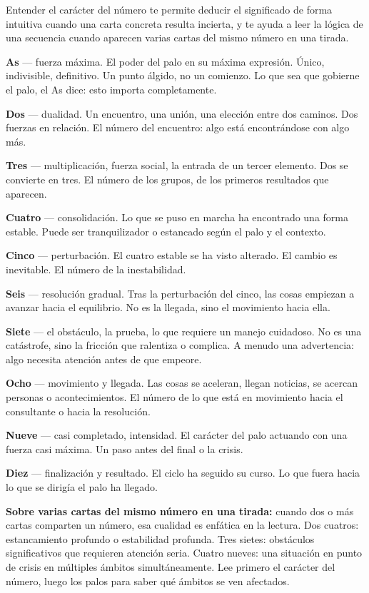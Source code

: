 Entender el carácter del número te permite deducir el significado de forma intuitiva cuando una carta concreta resulta incierta, y te ayuda a leer la lógica de una secuencia cuando aparecen varias cartas del mismo número en una tirada.

\textbf{As} --- fuerza máxima. El poder del palo en su máxima expresión. Único, indivisible, definitivo. Un punto álgido, no un comienzo. Lo que sea que gobierne el palo, el As dice: esto importa completamente.

\textbf{Dos} --- dualidad. Un encuentro, una unión, una elección entre dos caminos. Dos fuerzas en relación. El número del encuentro: algo está encontrándose con algo más.

\textbf{Tres} --- multiplicación, fuerza social, la entrada de un tercer elemento. Dos se convierte en tres. El número de los grupos, de los primeros resultados que aparecen.

\textbf{Cuatro} --- consolidación. Lo que se puso en marcha ha encontrado una forma estable. Puede ser tranquilizador o estancado según el palo y el contexto.

\textbf{Cinco} --- perturbación. El cuatro estable se ha visto alterado. El cambio es inevitable. El número de la inestabilidad.

\textbf{Seis} --- resolución gradual. Tras la perturbación del cinco, las cosas empiezan a avanzar hacia el equilibrio. No es la llegada, sino el movimiento hacia ella.

\textbf{Siete} --- el obstáculo, la prueba, lo que requiere un manejo cuidadoso. No es una catástrofe, sino la fricción que ralentiza o complica. A menudo una advertencia: algo necesita atención antes de que empeore.

\textbf{Ocho} --- movimiento y llegada. Las cosas se aceleran, llegan noticias, se acercan personas o acontecimientos. El número de lo que está en movimiento hacia el consultante o hacia la resolución.

\textbf{Nueve} --- casi completado, intensidad. El carácter del palo actuando con una fuerza casi máxima. Un paso antes del final o la crisis.

\textbf{Diez} --- finalización y resultado. El ciclo ha seguido su curso. Lo que fuera hacia lo que se dirigía el palo ha llegado.

\textbf{Sobre varias cartas del mismo número en una tirada:} cuando dos o más cartas comparten un número, esa cualidad es enfática en la lectura. Dos cuatros: estancamiento profundo o estabilidad profunda. Tres sietes: obstáculos significativos que requieren atención seria. Cuatro nueves: una situación en punto de crisis en múltiples ámbitos simultáneamente. Lee primero el carácter del número, luego los palos para saber qué ámbitos se ven afectados.

